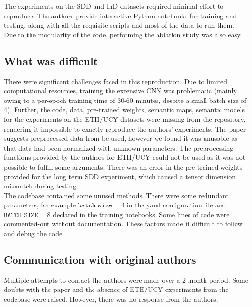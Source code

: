 The experiments on the SDD and InD datasets required minimal effort to reproduce. The authors provide interactive Python notebooks for training and testing, along with all the requisite scripts and most of the data to run them. Due to the modularity of the code, performing the ablation study was also easy.

\subsection{What was difficult}

There were significant challenges faced in this reproduction. Due to limited computational resources, training the extensive CNN was problematic (mainly owing to a per-epoch training time of 30-60 minutes, despite a small batch size of 4). Further, the code, data, pre-trained weights, semantic maps, semantic models for the experiments on the ETH/UCY datasets were missing from the repository, rendering it impossible to exactly reproduce the authors' experiments. The paper suggests preprocessed data from \cite{DBLP:journals/corr/abs-1803-10892} be used, however we found it was unusable as that data had been normalized with unknown parameters. The preprocessing functions provided by the authors for ETH/UCY could not be used as it was not possible to fulfill some arguments. There was an error in the pre-trained weights provided for the long term SDD experiment, which caused a tensor dimension mismatch during testing.\\ The codebase contained some unused methods. There were some redundant parameters, for example $\mathtt{batch\_ size} = 4$ in the yaml configuration file and $\mathtt{BATCH\_ SIZE} = 8$ declared in the training notebooks. Some lines of code were commented-out without documentation. These factors made it difficult to follow and debug the code.


\subsection{Communication with original authors}
 
Multiple attempts to contact the authors were made over a 2 month period. Some doubts with the paper and the absence of ETH/UCY experiments from the codebase were raised. However, there was no response from the authors.